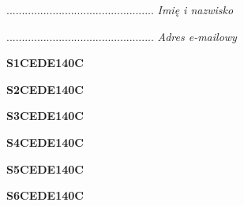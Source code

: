 \begin{turn}{90}\begin{minipage}{\linewidth} \vspace{20mm} ................................................  \textit{Imię i nazwisko}\end{minipage}\end{turn}

\begin{turn}{90}\begin{minipage}{\linewidth} \vspace{20mm} ................................................  \textit{Adres e-mailowy}\end{minipage}\end{turn}

\begin{turn}{90}\huge \begin{minipage}{\linewidth} \vspace{10mm}\textbf{S1CEDE140C}\end{minipage}\end{turn}

\begin{turn}{90}\huge \begin{minipage}{\linewidth} \vspace{10mm}\textbf{S2CEDE140C}\end{minipage}\end{turn}

\begin{turn}{90}\huge \begin{minipage}{\linewidth} \vspace{10mm}\textbf{S3CEDE140C}\end{minipage}\end{turn}

\begin{turn}{90}\huge \begin{minipage}{\linewidth} \vspace{10mm}\textbf{S4CEDE140C}\end{minipage}\end{turn}

\begin{turn}{90}\huge \begin{minipage}{\linewidth} \vspace{10mm}\textbf{S5CEDE140C}\end{minipage}\end{turn}

\begin{turn}{90}\huge \begin{minipage}{\linewidth} \vspace{10mm}\textbf{S6CEDE140C}\end{minipage}\end{turn}

